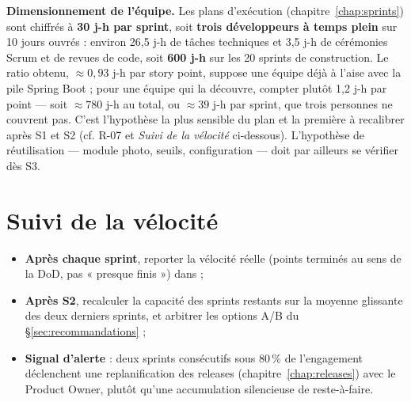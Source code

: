\begin{encadre}
\textbf{Dimensionnement de l'équipe.} Les plans d'exécution
(chapitre~\ref{chap:sprints}) sont chiffrés à \textbf{30 j-h par sprint},
soit \textbf{trois développeurs à temps plein} sur 10 jours ouvrés : environ
26,5 j-h de tâches techniques et 3,5 j-h de cérémonies Scrum et de revues de
code, soit \textbf{600 j-h} sur les 20 sprints de construction. Le ratio
obtenu, $\approx 0{,}93$ j-h par story point, suppose une équipe déjà à l'aise
avec la pile Spring Boot ; pour une équipe qui la découvre, compter plutôt
1,2 j-h par point --- soit $\approx 780$ j-h au total, ou $\approx 39$ j-h par
sprint, que trois personnes ne couvrent pas. C'est
l'hypothèse la plus sensible du plan et la première à recalibrer après S1
et S2 (cf. R-07 et \emph{Suivi de la vélocité} ci-dessous). L'hypothèse de
réutilisation --- module photo, seuils, configuration --- doit par ailleurs
se vérifier dès S3.
\end{encadre}

\section{Suivi de la vélocité}

\begin{itemize}
  \item \textbf{Après chaque sprint}, reporter la vélocité réelle (points
        terminés au sens de la DoD, pas « presque finis ») dans
         ;
  \item \textbf{Après S2}, recalculer la capacité des sprints restants sur
        la moyenne glissante des deux derniers sprints, et arbitrer les
        options A/B du §\ref{sec:recommandations} ;
  \item \textbf{Signal d'alerte} : deux sprints consécutifs sous 80\,\% de
        l'engagement déclenchent une replanification des releases
        (chapitre~\ref{chap:releases}) avec le Product Owner, plutôt qu'une
        accumulation silencieuse de reste-à-faire.
\end{itemize}
